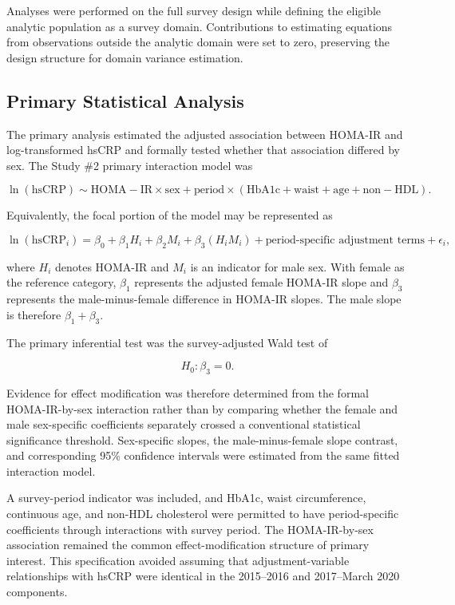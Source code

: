 \documentclass[11pt]{article}
\begin{document}
Analyses were performed on the full survey design while defining the eligible
analytic population as a survey domain. Contributions to estimating equations
from observations outside the analytic domain were set to zero, preserving the
design structure for domain variance estimation.

\subsection{Primary Statistical Analysis}

The primary analysis estimated the adjusted association between HOMA-IR and
log-transformed hsCRP and formally tested whether that association differed
by sex. The Study \#2 primary interaction model was

\[
\ln(\mathrm{hsCRP})
\sim
\mathrm{HOMA\!-\!IR}\times\mathrm{sex}
+
\mathrm{period}\times
(\mathrm{HbA1c}+\mathrm{waist}+\mathrm{age}+\mathrm{non\!-\!HDL}).
\]

Equivalently, the focal portion of the model may be represented as

\[
\ln(\mathrm{hsCRP}_i)
=
\beta_0
+\beta_1 H_i
+\beta_2 M_i
+\beta_3(H_iM_i)
+\text{period-specific adjustment terms}
+\epsilon_i,
\]

where $H_i$ denotes HOMA-IR and $M_i$ is an indicator for male sex. With
female as the reference category, $\beta_1$ represents the adjusted female
HOMA-IR slope and $\beta_3$ represents the male-minus-female difference in
HOMA-IR slopes. The male slope is therefore $\beta_1+\beta_3$.

The primary inferential test was the survey-adjusted Wald test of

\[
H_0:\beta_3=0.
\]

Evidence for effect modification was therefore determined from the formal
HOMA-IR-by-sex interaction rather than by comparing whether the female and
male sex-specific coefficients separately crossed a conventional statistical
significance threshold. Sex-specific slopes, the male-minus-female slope
contrast, and corresponding 95\% confidence intervals were estimated from the
same fitted interaction model.

A survey-period indicator was included, and HbA1c, waist circumference,
continuous age, and non-HDL cholesterol were permitted to have period-specific
coefficients through interactions with survey period. The HOMA-IR-by-sex
association remained the common effect-modification structure of primary
interest. This specification avoided assuming that adjustment-variable
relationships with hsCRP were identical in the 2015--2016 and
2017--March 2020 components.
\end{document}
